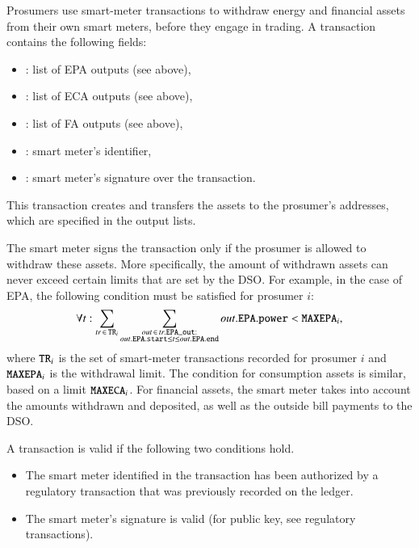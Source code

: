 Prosumers use smart-meter transactions to withdraw energy and financial assets from their own smart meters, before they engage in trading.
%
A transaction contains the following fields:
\begin{itemize}[noitemsep,topsep=-\parskip]
\item {}: list of EPA outputs (see above),
\item {}: list of ECA outputs (see above),
\item {}: list of FA outputs (see above),
\item {}: smart meter's identifier,
\item {}: smart meter's signature over the transaction.
\end{itemize}
\vspace{0.5\parskip}
This transaction creates and transfers the assets to the prosumer's addresses, which are specified in the output lists.

The smart meter signs the transaction only if the prosumer is allowed to withdraw these assets.
More specifically, the amount of withdrawn assets can never exceed certain limits that are set by the DSO.
For example, in the case of EPA, the following condition must be satisfied for prosumer $i$:
\begin{equation*}
\forall t: \sum_{tr \,\in\, \texttt{TR}_i} \sum_{\substack{out \,\in\, tr.\texttt{EPA\_out}:\\out.\texttt{EPA}.\texttt{start} \leq t \leq out.\texttt{EPA}.\texttt{end}}} out.\texttt{EPA}.\texttt{power} < \texttt{MAXEPA}_i ,
\end{equation*}
where $\texttt{TR}_i$ is the set of smart-meter transactions recorded for prosumer $i$ and $\texttt{MAXEPA}_i$ is the withdrawal limit.
The condition for consumption assets is similar, based on a limit $\texttt{MAXECA}_i$.
For financial assets, the smart meter takes into account the amounts withdrawn and deposited, as well as the outside bill payments to the DSO.

A transaction is valid if the following two conditions hold.
\begin{itemize}[noitemsep,topsep=-\parskip]
\item The smart meter identified in the transaction has been authorized by a regulatory transaction that was previously recorded on the ledger.
\item The smart meter's signature is valid (for public key, see regulatory transactions).
\end{itemize}

